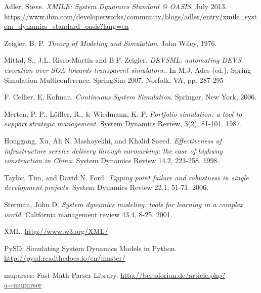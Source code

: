 \begin{thebibliography}{9}

  Adler, Steve. \textit{XMILE: System Dynamics Standard @ OASIS}. July 2013.   \url{https://www.ibm.com/developerworks/community/blogs/adler/entry/xmile_system_dynamics_standard_oasis?lang=en}

  Zeigler, B. P. \textit{Theory of Modeling and Simulation}. John Wiley, 1976.

  Mittal, S., J.L. Risco-Martín and B.P. Zeigler. \textit{DEVSML: automating DEVS execution over SOA towards transparent simulators.}. In M.J. Ades (ed.), Spring Simulation Multiconference, SpringSim 2007, Norfolk, VA, pp. 287-295

 F. Cellier, E. Kofman. \textit{Continuous System Simulation}. Springer, New York, 2006.

    Merten, P. P., Löffler, R., \& Wiedmann, K. P. \textit{Portfolio simulation: a tool to support strategic management}. System Dynamics Review, 3(2), 81-101. 1987.

Honggang, Xu, Ali N. Mashayekhi, and Khalid Saeed. \textit{Effectiveness of infrastructure service delivery through earmarking: the case of highway construction in China.} System Dynamics Review 14.2, 223-258. 1998.

Taylor, Tim, and David N. Ford. \textit{Tipping point failure and robustness in single development projects.} System Dynamics Review 22.1, 51-71. 2006.

    Sterman, John D. \textit{System dynamics modeling: tools for learning in a complex world.} California management review 43.4, 8-25. 2001.
    
XML. \url{http://www.w3.org/XML/}

PySD: Simulating System Dynamics Models in Python. \url{http://pysd.readthedocs.io/en/master/}

muparser: Fast Math Parser Library. \url{http://beltoforion.de/article.php?a=muparser}
    
\end{thebibliography}
